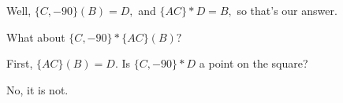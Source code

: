 



Well, $\{C,-90\} (B) = D,$ and $\{AC\} * D = B,$ so that's our answer.

What about $\{C,-90\} * \{AC\} (B)?$



First, $\{AC\} (B) = D.$  Is $\{C,-90\} * D$ a point on the square?





No, it is not.








